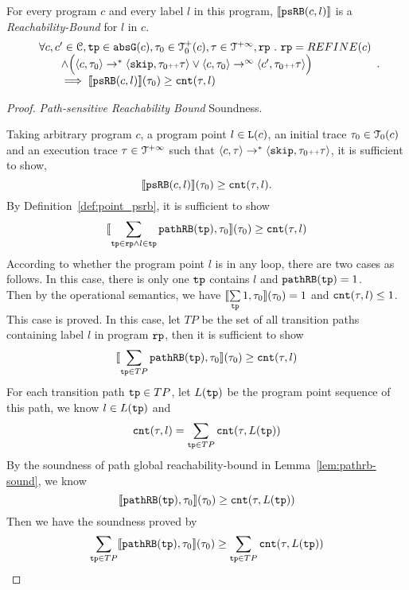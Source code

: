 \begin{theorem}
    For every program ${c}$ and every label $l$ in this program,
    $\llbracket \mathtt{psRB}(c, l) \rrbracket$ is a \emph{Reachability-Bound} for $l$ in $c$.
    \[
        \begin{array}{l}
          \forall c, c' \in \mathcal{C}, \mathtt{tp} \in \mathtt{abs}{\mathtt{G}}(c), \mathtt{\tau}_0 \in \mathcal{T}^{+}_0(c), \mathtt{\tau} \in \mathcal{T}^{+\infty}, \mathtt{rp} ~.~ 
          \mathtt{rp} = REFINE(c)
          \\ \qquad
          \land
          \Big(
          \langle c, \mathtt{\tau}_0 \rangle \to^* \langle \mathtt{skip}, \mathtt{\tau}_0 {\scriptscriptstyle ++} \mathtt{\tau} \rangle
          \lor \langle c, \mathtt{\tau}_0 \rangle \to^\infty \langle c', \mathtt{\tau}_0 {\scriptscriptstyle ++} \mathtt{\tau} \rangle 
          \Big)
          \\ \qquad
          \implies \llbracket \mathtt{psRB}(c, l) \rrbracket(\mathtt{\tau}_0) \geq \mathtt{cnt}(\mathtt{\tau}, l)
        \end{array}.
    \]
\end{theorem}
%
\begin{proof} \emph{Path-sensitive Reachability Bound} Soundness.

    Taking arbitrary program $c$, a program point $l \in \mathtt{L}(c)$, an initial trace $\mathtt{\tau}_0 \in \mathcal{T}_0(c)$ and an execution trace $\mathtt{\tau} \in \mathcal{T}^{+\infty}$
    such that $\langle {c}, \mathtt{\tau} \rangle \to^{*} \langle \mathtt{skip}, \mathtt{\tau}_0 {\scriptscriptstyle ++} \mathtt{\tau} \rangle$,
    it is sufficient to show,
    \[
    \llbracket \mathtt{psRB}(c, l) \rrbracket(\mathtt{\tau}_0) \geq \mathtt{cnt}(\mathtt{\tau}, l) .
    \]
    By Definition~\ref{def:point_psrb}, it is sufficient to show 
    \[
    \llbracket \sum\limits_{\mathtt{tp} \in \mathtt{rp} \land  l \in \mathtt{tp}} \mathtt{pathRB}(\mathtt{tp}), \mathtt{\tau}_0 \rrbracket(\mathtt{\tau}_0)  \geq  \mathtt{cnt}(\mathtt{\tau}, l)
    \]
    According to whether the program point $l$ is in any loop, there are two cases as follows.
    In this case, there is only one $\mathtt{tp}$ contains $l$ and $\mathtt{pathRB}(\mathtt{tp}) = 1$.
    \\
    Then by the operational semantics, we have $\llbracket \sum\limits_{\mathtt{tp}} 1, \mathtt{\tau}_0 \rrbracket(\mathtt{\tau}_0) =  1$ and $ \mathtt{cnt}(\mathtt{\tau}, l) \leq 1$.
    \\
    This case is proved.
    In this case, let $TP$ be the set of all transition paths containing 
    label $l$ in program $\mathtt{rp}$, then it is sufficient to show 
    \[
        \llbracket \sum\limits_{\mathtt{tp} \in TP} \mathtt{pathRB}(\mathtt{tp}), \mathtt{\tau}_0 \rrbracket(\mathtt{\tau}_0)  \geq  \mathtt{cnt}(\mathtt{\tau}, l)
    \]
    For each transition path $\mathtt{tp} \in TP$, let $L(\mathtt{tp})$ be the program point sequence of this path, we know $l \in L(\mathtt{tp})$
    and 
    \[
        \mathtt{cnt}(\mathtt{\tau}, l) = \sum\limits_{\mathtt{tp} \in TP} \mathtt{cnt}(\mathtt{\tau}, L(\mathtt{tp}))
    \]
    By the soundness of path global reachability-bound in Lemma~\ref{lem:pathrb-sound}, we know
    \[
        \llbracket \mathtt{pathRB}(\mathtt{tp}), \mathtt{\tau}_0 \rrbracket(\mathtt{\tau}_0)  \geq  \mathtt{cnt}(\mathtt{\tau}, L(\mathtt{tp}))
    \]
    Then we have the soundness proved by
    \[
        \sum\limits_{\mathtt{tp} \in TP} \llbracket \mathtt{pathRB}(\mathtt{tp}), \mathtt{\tau}_0 \rrbracket(\mathtt{\tau}_0)  \geq \sum\limits_{\mathtt{tp} \in TP}  \mathtt{cnt}(\mathtt{\tau}, L(\mathtt{tp}))
    \]
\end{proof}
  
